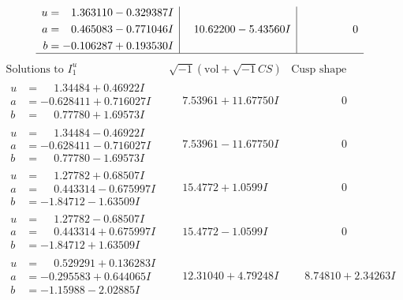 \documentclass[1p]{elsarticle_modified}
\theoremstyle{definition}
\newcommand{\I}{\sqrt{-1}}
\begin{document}
$$\begin{array}{c|c|c}
\begin{aligned}
u &= \phantom{-}1.363110 - 0.329387 I \\
a &= \phantom{-}0.465083 - 0.771046 I \\
b &= -0.106287 + 0.193530 I\end{aligned}
 & \phantom{-}10.62200 - 5.43560 I & \phantom{-0.000000 } 0\\
 \hline 
 \end{array}$$\newpage$$\begin{array}{c|c|c}  
\text{Solutions to }I^u_{1}& \I (\text{vol} + \sqrt{-1}CS) & \text{Cusp shape}\\
 \hline 
\begin{aligned}
u &= \phantom{-}1.34484 + 0.46922 I \\
a &= -0.628411 + 0.716027 I \\
b &= \phantom{-}0.77780 + 1.69573 I\end{aligned}
 & \phantom{-}7.53961 + 11.67750 I & \phantom{-0.000000 } 0 \\ \hline\begin{aligned}
u &= \phantom{-}1.34484 - 0.46922 I \\
a &= -0.628411 - 0.716027 I \\
b &= \phantom{-}0.77780 - 1.69573 I\end{aligned}
 & \phantom{-}7.53961 - 11.67750 I & \phantom{-0.000000 } 0 \\ \hline\begin{aligned}
u &= \phantom{-}1.27782 + 0.68507 I \\
a &= \phantom{-}0.443314 - 0.675997 I \\
b &= -1.84712 - 1.63509 I\end{aligned}
 & \phantom{-}15.4772 + 1.0599 I & \phantom{-0.000000 } 0 \\ \hline\begin{aligned}
u &= \phantom{-}1.27782 - 0.68507 I \\
a &= \phantom{-}0.443314 + 0.675997 I \\
b &= -1.84712 + 1.63509 I\end{aligned}
 & \phantom{-}15.4772 - 1.0599 I & \phantom{-0.000000 } 0 \\ \hline\begin{aligned}
u &= \phantom{-}0.529291 + 0.136283 I \\
a &= -0.295583 + 0.644065 I \\
b &= -1.15988 - 2.02885 I\end{aligned}
 & \phantom{-}12.31040 + 4.79248 I & \phantom{-}8.74810 + 2.34263 I \\ \hline\begin{aligned}

\end{aligned}
\end{array}$$
\end{document}
